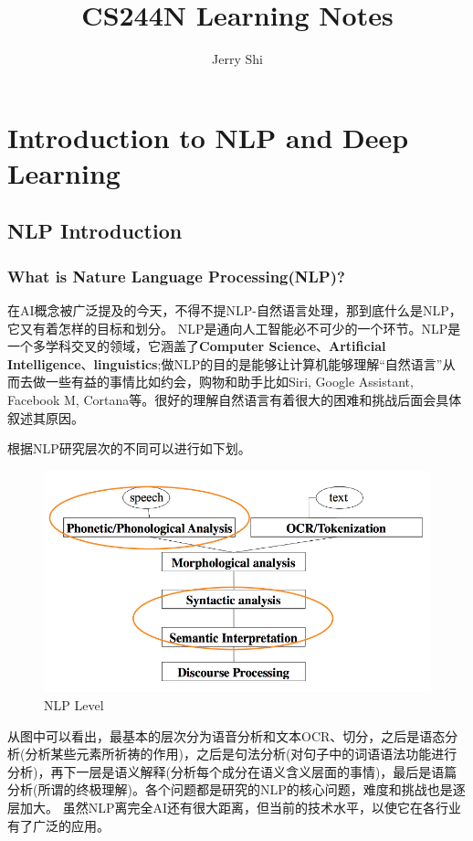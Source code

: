\documentclass[twoside,nofonts,fancyhdr,openany,UTF8]{ctexbook}
\title{CS244N Learning Notes}	%
\author{Jerry Shi}			%
\affil{HELIX LAB}
\begin{document}
\maketitle					%

\tableofcontents 			%

\mainmatter 				%
\renewcommand\thesection{\arabic {section}}

\chapter{Introduction to NLP and Deep Learning}			%
\section{NLP Introduction}
\subsection{What is Nature Language Processing(NLP)?}
在AI概念被广泛提及的今天，不得不提NLP-自然语言处理，那到底什么是NLP，它又有着怎样的目标和划分。
NLP是通向人工智能必不可少的一个环节。NLP是一个多学科交叉的领域，它涵盖了\textbf{Computer Science}、\textbf{Artificial Intelligence}、\textbf{linguistics};做NLP的目的是能够让计算机能够理解“自然语言”从而去做一些有益的事情比如约会，购物和助手比如Siri, Google Assistant, Facebook M, Cortana等。很好的理解自然语言有着很大的困难和挑战后面会具体叙述其原因。

根据NLP研究层次的不同可以进行如下划。

\begin{figure}[!htb]
\centering
\includegraphics[scale=0.3]{nlp_level}
\caption{NLP Level}
\end{figure}

从图中可以看出，最基本的层次分为语音分析和文本OCR、切分，之后是语态分析(分析某些元素所祈祷的作用)，之后是句法分析(对句子中的词语语法功能进行分析)，再下一层是语义解释(分析每个成分在语义含义层面的事情)，最后是语篇分析(所谓的终极理解)。各个问题都是研究的NLP的核心问题，难度和挑战也是逐层加大。
虽然NLP离完全AI还有很大距离，但当前的技术水平，以使它在各行业有了广泛的应用。
\end{document}
